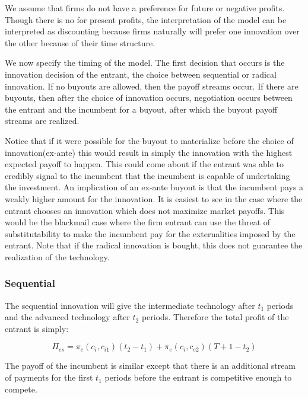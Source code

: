 
We assume that firms do not have a preference for future or negative profits. Though there is no  for present profits, the interpretation of the model can be interpreted as discounting because firms naturally will prefer one innovation over the other because of their time structure. 

We now specify the timing of the model. The first decision that occurs is the innovation decision of the entrant, the choice between sequential or radical innovation. If no buyouts are allowed, then the payoff streams occur. If there are buyouts, then after the choice of innovation occurs, negotiation occurs between the entrant and the incumbent for a buyout, after which the buyout payoff streams are realized.

Notice that if it were possible for the buyout to materialize before the choice of innovation(ex-ante) this would result in simply the innovation with the highest expected payoff to happen. This could come about if the entrant was able to credibly signal to the incumbent that the incumbent is capable of undertaking the investment. An implication of an ex-ante buyout is that the incumbent pays a weakly higher amount for the innovation. It is easiest to see in the case where the entrant chooses an innovation which does not maximize market payoffs. This would be the blackmail case where the firm entrant can use the threat of substitutability to make the incumbent pay for the externalities imposed by the entrant. Note that if the radical innovation is bought, this does not guarantee the realization of the technology. 

\subsubsection{Sequential}

The sequential innovation will give the intermediate technology after $t_1$ periods and the advanced technology after $t_2$ periods. Therefore the total profit of the entrant is simply: 

\begin{equation*}
\Pi_{es} = \pi_e(c_i,c_{i1}) (t_2-t_1) +\pi_e(c_i,c_{e2})(T+1-t_2)
\end{equation*}

The payoff of the incumbent is similar except that there is an additional stream of payments for the first $t_1$ periods before the entrant is competitive enough to compete. 

